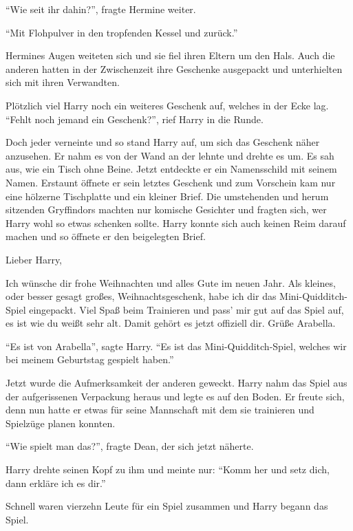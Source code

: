 \enquote{Wie seit ihr dahin\abs ?}, fragte Hermine weiter.

\enquote{Mit Flohpulver in den tropfenden Kessel und zurück.}

Hermines Augen weiteten sich und sie fiel ihren Eltern um den Hals. Auch die anderen hatten in der Zwischenzeit ihre Geschenke ausgepackt und unterhielten sich mit ihren Verwandten.

Plötzlich viel Harry noch ein weiteres Geschenk auf, welches in der Ecke lag. \enquote{Fehlt noch jemand ein Geschenk?}, rief Harry in die Runde.

Doch jeder verneinte und so stand Harry auf, um sich das Geschenk näher anzusehen. Er nahm es von der Wand an der lehnte und drehte es um. Es sah aus, wie ein Tisch ohne Beine. Jetzt entdeckte er ein Namensschild mit seinem Namen. Erstaunt öffnete er sein letztes Geschenk und zum Vorschein kam nur eine hölzerne Tischplatte und ein kleiner Brief. Die umstehenden und herum sitzenden Gryffindors machten nur komische Gesichter und fragten sich, wer Harry wohl so etwas schenken sollte. Harry konnte sich auch keinen Reim darauf machen und so öffnete er den beigelegten Brief.

\begin{brief}
Lieber Harry,

Ich wünsche dir frohe Weihnachten und alles Gute im neuen Jahr. Als kleines, oder besser gesagt großes, Weihnachtsgeschenk, habe ich dir das Mini-Quidditch-Spiel eingepackt. Viel Spaß beim Trainieren und pass' mir gut auf das Spiel auf, es ist wie du weißt sehr alt. Damit gehört es jetzt offiziell dir.
\signumspace
Grüße Arabella.
\end{brief}


\enquote{Es ist von Arabella}, sagte Harry. \enquote{Es ist das Mini-Quidditch-Spiel, welches wir bei meinem Geburtstag gespielt haben.}

Jetzt wurde die Aufmerksamkeit der anderen geweckt. Harry nahm das Spiel aus der aufgerissenen Verpackung heraus und legte es auf den Boden. Er freute sich, denn nun hatte er etwas für seine Mannschaft mit dem sie trainieren und Spielzüge planen konnten.

\enquote{Wie spielt man das?}, fragte Dean, der sich jetzt näherte.

Harry drehte seinen Kopf zu ihm und meinte nur: \enquote{Komm her und setz dich, dann erkläre ich es dir.}

Schnell waren vierzehn Leute für ein Spiel zusammen und Harry begann das Spiel.


